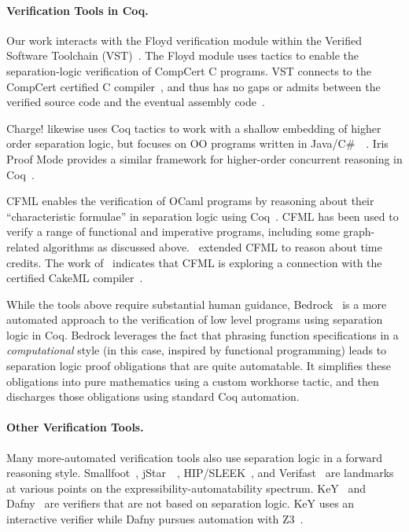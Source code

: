 \documentclass[acmsmall,screen]{acmart}
\begin{document}
\paragraph{Verification Tools in Coq.}
Our work interacts with the Floyd verification module within the Verified 
Software Toolchain (VST)~\cite{appel:programlogics}. The Floyd module uses 
tactics to enable the separation-logic verification of CompCert C programs. 
VST connects to the CompCert certified C compiler~\cite{leroy:compcert}, and 
thus has no gaps or admits between the verified source code and the eventual
assembly code~\cite{appelvst}.

Charge! likewise uses Coq tactics to work with a shallow embedding of higher 
order separation logic, but focuses on OO programs written in 
Java/C\#~~\cite{bengtson:charge}. Iris Proof Mode provides a similar framework 
for higher-order concurrent reasoning in Coq~\cite{krebbers:iris}.

CFML enables the verification of OCaml programs by reasoning about their
``characteristic formulae'' in separation logic using Coq~\cite{char10, char11}. 
CFML has been used to verify a range of functional and imperative programs,
including some graph-related algorithms as discussed 
above. \citet{charpott15, charpott19}~extended CFML to reason about time 
credits. The work of \citet{gueneau17}~indicates that CFML is exploring a connection 
with the certified CakeML compiler~\cite{cakeml}.

While the tools above require substantial human guidance, 
Bedrock~\cite{chlipala:bedrock} is a more automated approach to the verification of 
low level programs using separation logic in Coq. 
Bedrock leverages the fact that phrasing function 
specifications in a \emph{computational} style 
(in this case, inspired by functional programming) 
leads to separation logic proof obligations that are quite automatable.
It simplifies these obligations into pure mathematics using a 
custom workhorse tactic, and then discharges those 
obligations using standard Coq automation.

\paragraph{Other Verification Tools.} 

Many more-automated verification tools also use separation logic in a forward
reasoning style. Smallfoot~\cite{berdine:smallfoot}, jStar~~\cite{distefanop08}, 
HIP/SLEEK~\cite{chin:hipsleek}, and Verifast~\cite{jacobs:verifast} are landmarks
at various points on the expressibility-automatability spectrum. 
KeY~\cite{beckert:2007} and Dafny~\cite{leino10} are verifiers that are not 
based on separation logic. KeY uses an interactive verifier while Dafny pursues
 automation with Z3~\cite{moura2008}.
\end{document}
